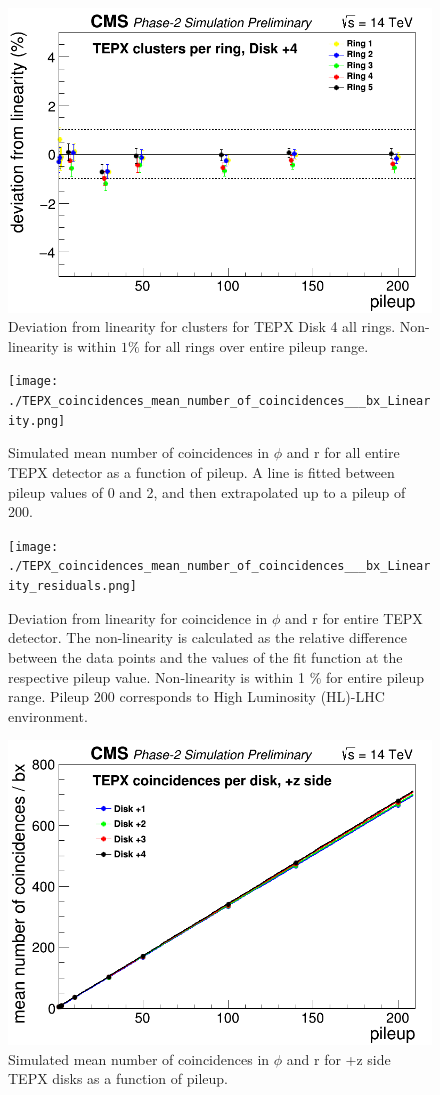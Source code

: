 \begin{figure}[H]
  \centering
  \includegraphics[width=0.5\columnwidth]{./TEPX_clusters_per_ringDisk4_Linearity_residuals.png}
  \caption{Deviation from linearity for clusters for TEPX Disk 4 all rings. Non-linearity is within $1\%$ for all rings over entire pileup range.}
  \label{fig:CMS}
\end{figure}








\begin{figure}[H]
  \centering
  \texttt{[image: ./TEPX\_coincidences\_mean\_number\_of\_coincidences\_\_\_bx\_Linearity.png]}
  \caption{Simulated mean number of coincidences in $\phi$ and r for all entire TEPX detector as a function of pileup. A line is fitted between pileup values of 0 and 2, and then extrapolated up to a pileup of 200.}
  \label{fig:CMS}
\end{figure}


\begin{figure}[H]
  \centering
  \texttt{[image: ./TEPX\_coincidences\_mean\_number\_of\_coincidences\_\_\_bx\_Linearity\_residuals.png]}
  \caption{Deviation from linearity for coincidence in $\phi$ and r for entire TEPX detector. The non-linearity is calculated as
the relative difference between the data points and the values of the fit function at the respective pileup value.
Non-linearity is within 1 \% for entire pileup range. Pileup 200 corresponds to High Luminosity (HL)-LHC
environment.}
  \label{fig:CMS}
\end{figure}




\begin{figure}[H]
  \centering
  \includegraphics[width=0.5\columnwidth]{./TEPX_coincidences_per_disk__pz_side_mean_number_of_coincidences___bx_Linearity.png}
  \caption{Simulated mean number of coincidences in $\phi$ and r for +z side TEPX disks as a function of pileup.}
  \label{fig:CMS}
\end{figure}


